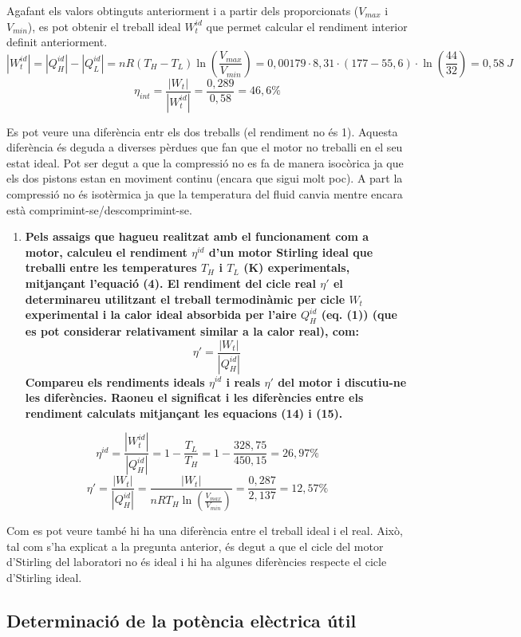 \documentclass[a4paper]{article}
\begin{document}
Agafant els valors obtinguts anteriorment i a partir dels proporcionats ($V_{max}$ i $V_{min}$), es pot obtenir el treball ideal $W_t^{id}$ que permet calcular el rendiment interior definit anteriorment.
$$
|W_t^{id}| = |Q_H^{id}| - |Q_L^{id}| = 
nR(T_H - T_L)\ln\left(\frac{V_{max}}{V_{min}}\right) = 
0,00179·8,31·(177 - 55,6)·\ln\left(\frac{44}{32}\right) = 0,58\ J
$$
$$
\eta_{int} = \frac{|W_t|}{|W_t^{id}|} = 
\frac{0,289}{0,58} = \boxed{46,6\%}
$$

Es pot veure una diferència entr els dos treballs (el rendiment no és 1). Aquesta diferència és deguda a diverses pèrdues que fan que el motor no treballi en el seu estat ideal. Pot ser degut a que la compressió no es fa de manera isocòrica ja que els dos pistons estan en moviment continu (encara que sigui molt poc). A part la compressió no és isotèrmica ja que la temperatura del fluid canvia mentre encara està comprimint-se/descomprimint-se.

\begin{enumerate}[resume]
	\item \textbf{Pels assaigs que hagueu realitzat amb el funcionament com a motor, calculeu el rendiment $\eta^{id}$ d'un motor Stirling ideal que treballi entre les temperatures $T_H$ i $T_L$ (K) experimentals, mitjançant l’equació (4). El rendiment del cicle real $\eta'$ el determinareu utilitzant el treball termodinàmic per cicle $W_t$ experimental i la calor ideal absorbida per l’aire $Q_H^{id}$ (eq. (1)) (que es pot considerar relativament similar a la calor real), com:}
	$$
	\eta'= \frac{|W_t|}{|Q_H^{id}|}
	$$
	\textbf{Compareu els rendiments ideals $\eta^{id}$ i reals $\eta'$ del motor i discutiu-ne les diferències. Raoneu el significat i les diferències entre els rendiment calculats mitjançant les equacions (14) i (15).}
\end{enumerate}

$$
\eta^{id} = \frac{|W_t^{id}|}{|Q_H^{id}|} = 
1 - \frac{T_L}{T_H} = 1 - \frac{328,75}{450,15} = \boxed{26,97\%}
$$
$$
\eta' = \frac{|W_t|}{|Q_H^{id}|} =
\frac{|W_t|}{nRT_H\ln\left(\frac{V_{max}}{V_{min}}\right)} = 
\frac{0,287}{2,137} = \boxed{12,57\%}
$$

Com es pot veure també hi ha una diferència entre el treball ideal i el real. Això, tal com s'ha explicat a la pregunta anterior, és degut a que el cicle del motor d'Stirling del laboratori no és ideal i hi ha algunes diferències respecte el cicle d'Stirling ideal.

\subsection{Determinació de la potència elèctrica útil}
\end{document}
